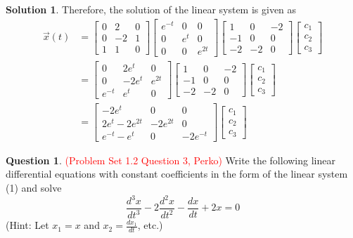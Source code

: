 \documentclass[11pt]{article}
\theoremstyle{definition}\newtheorem{definition}{Definition}
\theoremstyle{definition}\newtheorem{question}{Question}
\theoremstyle{definition}\newtheorem*{solution}{Solution}
\theoremstyle{definition}\newtheorem{example}{Example}
\theoremstyle{definition}\newtheorem{notation}{Notation}
\theoremstyle{theorem}\newtheorem{theorem}{Theorem}
\theoremstyle{theorem}\newtheorem{corollary}{Corollary}
\theoremstyle{theorem}\newtheorem{lemma}{Lemma}
\theoremstyle{theorem}\newtheorem{proposition}{Proposition}
\begin{document}
\begin{solution}
    Therefore, the solution of the linear system is given as
    \begin{align*}
        \vec{x}(t) &= \begin{bmatrix} 0 & 2 & 0 \\ 0 & -2 & 1 \\ 1 & 1 & 0 \end{bmatrix}\begin{bmatrix} e^{-t} & 0 & 0 \\ 0 & e^t & 0 \\ 0 & 0 & e^{2t} \end{bmatrix} \begin{bmatrix} 1 & 0 & -2 \\ -1 & 0 & 0 \\ -2 & -2 & 0 \end{bmatrix}\begin{bmatrix} c_1 \\ c_2 \\ c_3 \end{bmatrix} \\
        &= \begin{bmatrix} 0 & 2e^t & 0 \\ 0 & -2e^t & e^{2t} \\ e^{-t} & e^t & 0 \end{bmatrix} \begin{bmatrix} 1 & 0 & -2 \\ -1 & 0 & 0 \\ -2 & -2 & 0 \end{bmatrix} \begin{bmatrix} c_1 \\ c_2 \\ c_3 \end{bmatrix} \\
        &= \begin{bmatrix} -2e^t & 0 & 0 \\ 2e^t - 2e^{2t} & -2e^{2t} & 0 \\ e^{-t} - e^t & 0 & -2e^{-t} \end{bmatrix}\begin{bmatrix} c_1 \\ c_2 \\ c_3 \end{bmatrix}
    \end{align*}
\end{solution}

\begin{question}
    \textcolor{red}{(Problem Set 1.2 Question 3, Perko)} Write the following linear differential equations with constant coefficients in the form of the linear system (1) and solve
    \begin{equation*}
        \frac{d^3x}{dt^3} - 2\frac{d^2x}{dt^2} - \frac{dx}{dt} + 2x = 0
    \end{equation*}
    (Hint: Let $x_1 = x$ and $x_2 = \frac{dx_1}{dt}$, etc.)
\end{question}
\end{document}
